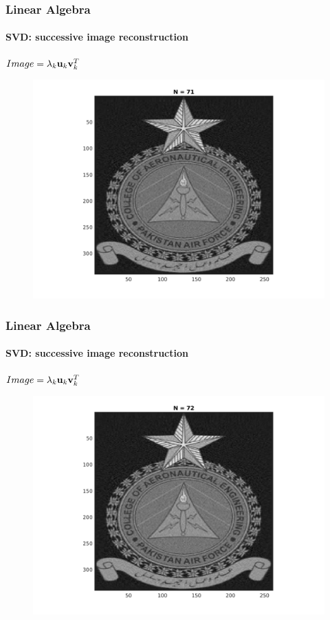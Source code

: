 \documentclass[hyperref={pdfpagelabels=true}]{beamer}
\begin{document}
\begin{frame}
\frametitle{Linear Algebra}
\framesubtitle{SVD: successive image reconstruction} 
\small{
\begin{center}
$Image = \lambda_k{\bf u}_k {\bf v}_k^T$
\end{center}}
\begin{figure}[!htb]
\centering
\includegraphics [scale=0.48]{n/b71.png}
\end{figure}
\end{frame}

\begin{frame}
\frametitle{Linear Algebra}
\framesubtitle{SVD: successive image reconstruction} 
\small{
\begin{center}
$Image = \lambda_k{\bf u}_k {\bf v}_k^T$
\end{center}}
\begin{figure}[!htb]
\centering
\includegraphics [scale=0.48]{n/b72.png}
\end{figure}
\end{frame}
\end{document}
